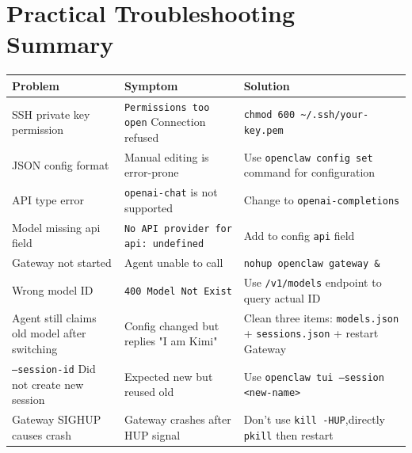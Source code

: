 \hrulefill

\section{Practical Troubleshooting Summary}


\begin{table}[h]
\centering
\small
\begin{tabular}{|l|l|l|}
\hline
Problem & Symptom & Solution \\
\hline
SSH private key permission & \texttt{Permissions too open} Connection refused & \texttt{chmod 600 \textasciitilde{}/.ssh/your-key.pem} \\
\hline
JSON config format & Manual editing is error-prone & Use \texttt{openclaw config set} command for configuration \\
\hline
API type error & \texttt{openai-chat} is not supported & Change to \texttt{openai-completions} \\
\hline
Model missing api field & \texttt{No API provider for api: undefined} & Add to config \texttt{api} field \\
\hline
Gateway not started & Agent unable to call & \texttt{nohup openclaw gateway \&} \\
\hline
Wrong model ID & \texttt{400 Model Not Exist} & Use \texttt{/v1/models} endpoint to query actual ID \\
\hline
Agent still claims old model after switching & Config changed but replies "I am Kimi" & Clean three items: \texttt{models.json} + \texttt{sessions.json} + restart Gateway \\
\hline
\texttt{--session-id} Did not create new session & Expected new but reused old & Use \texttt{openclaw tui --session <new-name>} \\
\hline
Gateway SIGHUP causes crash & Gateway crashes after HUP signal & Don't use \texttt{kill -HUP},directly  \texttt{pkill}  then restart \\
\hline
\end{tabular}
\end{table}


\clearpage
